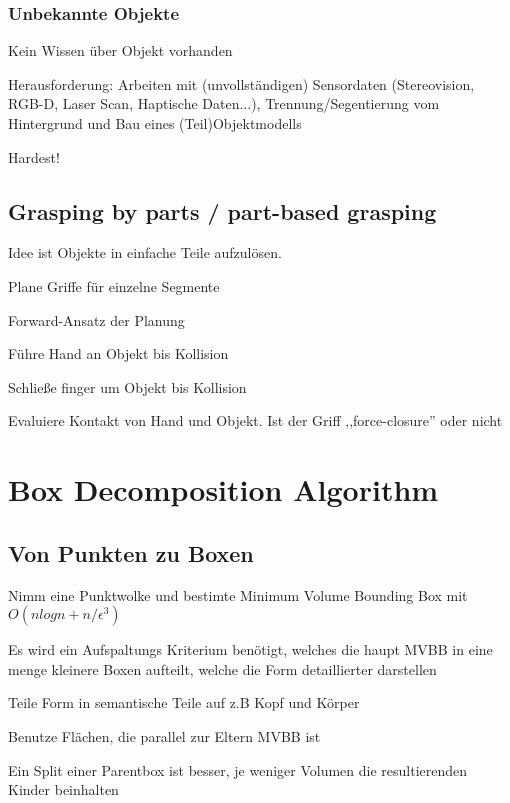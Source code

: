 \subsubsection{Unbekannte Objekte}
 \begin{compactitem}
     \item Kein Wissen über Objekt vorhanden
     \item Herausforderung: Arbeiten mit (unvollständigen) Sensordaten (Stereovision,
     RGB-D, Laser Scan, Haptische Daten...), Trennung/Segentierung vom Hintergrund und
     Bau eines (Teil)Objektmodells
     \item Hardest!
 \end{compactitem}

 \subsection{Grasping by parts / part-based grasping}
 \begin{compactitem}
     \item Idee ist Objekte in einfache Teile aufzulösen.
     \item Plane Griffe für einzelne Segmente
 \end{compactitem}
 Forward-Ansatz der Planung
 \begin{compactitem}
     \item Führe Hand an Objekt bis Kollision
     \item Schließe finger um Objekt bis Kollision
     \item Evaluiere Kontakt von Hand und Objekt. Ist der Griff ,,force-closure''
     oder nicht
 \end{compactitem}


 \section{Box Decomposition Algorithm}
 \subsection{Von Punkten zu Boxen}
 \begin{compactitem}
     \item Nimm eine Punktwolke und bestimte Minimum Volume Bounding Box mit
     $O(n log n + n/\epsilon^3)$
     \item Es wird ein Aufspaltungs Kriterium benötigt, welches die haupt MVBB in
     eine menge kleinere Boxen aufteilt, welche die Form detaillierter darstellen
     \item Teile Form in semantische Teile auf z.B Kopf und Körper
     \item Benutze Flächen, die parallel zur Eltern MVBB ist
     \item Ein Split einer Parentbox ist besser, je weniger Volumen die resultierenden
     Kinder beinhalten
 \end{compactitem}

